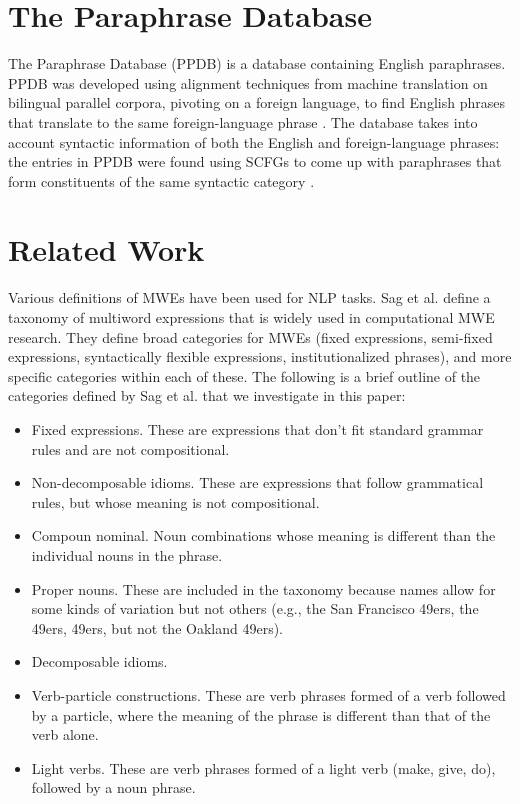 \documentclass[11pt]{article}
\begin{document}
\section{The Paraphrase Database}

The Paraphrase Database (PPDB) is a database containing English paraphrases. PPDB was developed using alignment techniques from machine translation on bilingual parallel corpora, pivoting on a foreign language, to find English phrases that translate to the same foreign-language phrase . The database takes into account syntactic information of both the English and foreign-language phrases: the entries in PPDB were found using SCFGs to come up with paraphrases that form constituents of the same syntactic category \cite{ganitkevitch-EtAl:2011:EMNLP,ganitkevitch-vandurme-callisonburch:2013:NAACL-HLT}.

\section{Related Work}

Various definitions of MWEs have been used for NLP tasks. Sag et al. define a taxonomy of multiword expressions that is widely used in computational MWE research. They define broad categories for MWEs (fixed expressions, semi-fixed expressions, syntactically flexible expressions, institutionalized phrases), and more specific categories within each of these. The following is a brief outline of the categories defined by Sag et al. that we investigate in this paper:

\begin{itemize}
\item Fixed expressions. These are expressions that don't fit standard grammar rules and are not compositional.

\item Non-decomposable idioms. These are expressions that follow grammatical rules, but whose meaning is not compositional.

\item Compoun nominal. Noun combinations whose meaning is different than the individual nouns in the phrase.

\item Proper nouns. These are included in the taxonomy because names allow for some kinds of variation but not others (e.g., the San Francisco 49ers, the 49ers, 49ers, but not the Oakland 49ers).

\item Decomposable idioms. 

\item Verb-particle constructions. These are verb phrases formed of a verb followed by a particle, where the meaning of the phrase is different than that of the verb alone.

\item Light verbs. These are verb phrases formed of a light verb (make, give, do), followed by a noun phrase.
\end{itemize}
\end{document}

